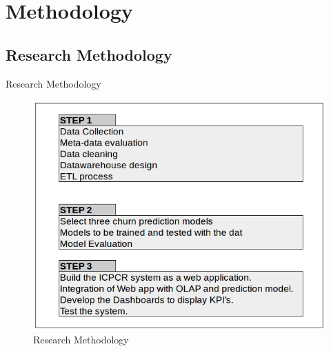 \documentclass{beamer}
\begin{document}
\section{Methodology}

\subsection{Research Methodology}
\begin{frame}{Research Methodology}
	\begin{figure}
		\includegraphics[scale = 0.35]{figures/ICPCR.png}
		\centering
		\caption{Research Methodology}
	\end{figure}
\end{frame}
\end{document}
